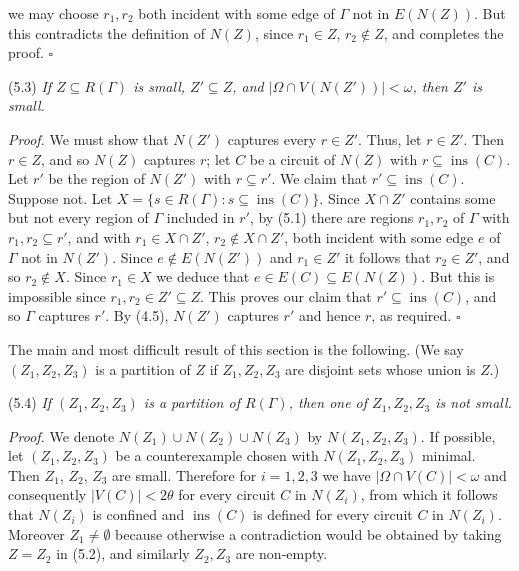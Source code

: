 \noindent we may choose $r_1, r_2$ both incident with some edge of $\Gamma$ not in $E(N(Z))$. But this contradicts the definition of $N(Z)$, since $r_1 \in Z$, $r_2 \notin Z$, and completes the proof. $\square$

\stmt
(5.3) \textit{If $Z \subseteq R(\Gamma)$ is small, $Z' \subseteq Z$, and $|\Omega \cap V(N(Z'))| < \omega$, then $Z'$ is small.}

\textit{Proof.} We must show that $N(Z')$ captures every $r \in Z'$. Thus, let $r \in Z'$. Then $r \in Z$, and so $N(Z)$ captures $r$; let $C$ be a circuit of $N(Z)$ with $r \subseteq \operatorname{ins}(C)$. Let $r'$ be the region of $N(Z')$ with $r \subseteq r'$. We claim that $r' \subseteq \operatorname{ins}(C)$. Suppose not. Let $X = \{s \in R(\Gamma) : s \subseteq \operatorname{ins}(C)\}$. Since $X \cap Z'$ contains some but not every region of $\Gamma$ included in $r'$, by (5.1) there are regions $r_1, r_2$ of $\Gamma$ with $r_1, r_2 \subseteq r'$, and with $r_1 \in X \cap Z'$, $r_2 \notin X \cap Z'$, both incident with some edge $e$ of $\Gamma$ not in $N(Z')$. Since $e \notin E(N(Z'))$ and $r_1 \in Z'$ it follows that $r_2 \in Z'$, and so $r_2 \notin X$. Since $r_1 \in X$ we deduce that $e \in E(C) \subseteq E(N(Z))$. But this is impossible since $r_1, r_2 \in Z' \subseteq Z$. This proves our claim that $r' \subseteq \operatorname{ins}(C)$, and so $\Gamma$ captures $r'$. By (4.5), $N(Z')$ captures $r'$ and hence $r$, as required. $\square$

The main and most difficult result of this section is the following. (We say $(Z_1, Z_2, Z_3)$ is a partition of $Z$ if $Z_1, Z_2, Z_3$ are disjoint sets whose union is $Z$.)

\stmt
(5.4) \textit{If $(Z_1, Z_2, Z_3)$ is a partition of $R(\Gamma)$, then one of $Z_1, Z_2, Z_3$ is not small.}

\textit{Proof.} We denote $N(Z_1) \cup N(Z_2) \cup N(Z_3)$ by $N(Z_1, Z_2, Z_3)$. If possible, let $(Z_1, Z_2, Z_3)$ be a counterexample chosen with $N(Z_1, Z_2, Z_3)$ minimal. Then $Z_1$, $Z_2$, $Z_3$ are small. Therefore for $i = 1, 2, 3$ we have $|\Omega \cap V(C)| < \omega$ and consequently $|V(C)| < 2\theta$ for every circuit $C$ in $N(Z_i)$, from which it follows that $N(Z_i)$ is confined and $\operatorname{ins}(C)$ is defined for every circuit $C$ in $N(Z_i)$. Moreover $Z_1 \ne \emptyset$ because otherwise a contradiction would be obtained by taking $Z = Z_2$ in (5.2), and similarly $Z_2, Z_3$ are non-empty.


